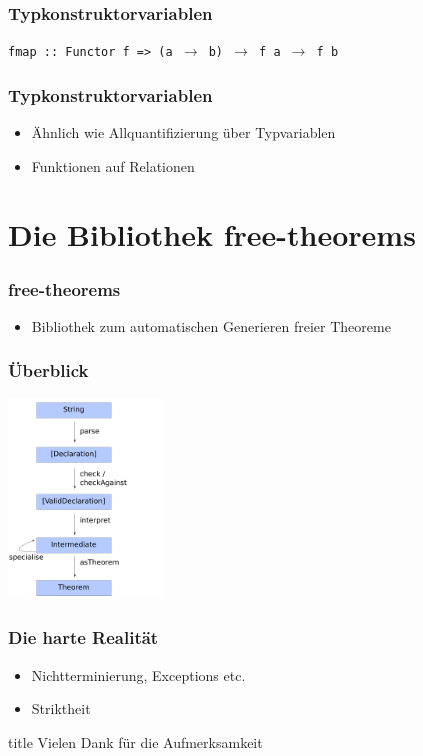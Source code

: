 \documentclass{beamer}
\begin{document}
\begin{frame}
\frametitle{Typkonstruktorvariablen}
\texttt{fmap :: Functor f => (a $\rightarrow$ b) $\rightarrow$ f\ a $\rightarrow$ f\ b}
\end{frame}

\begin{frame}
\frametitle{Typkonstruktorvariablen}
\begin{itemize}
\item Ähnlich wie Allquantifizierung über Typvariablen
\item Funktionen auf Relationen
\end{itemize}
\end{frame}

\section{Die Bibliothek free-theorems}

\begin{frame}
\frametitle{free-theorems}
\begin{itemize}
\item Bibliothek zum automatischen Generieren freier Theoreme
\end{itemize}
\end{frame}

\begin{frame}
\frametitle{Überblick}
\includegraphics[height=200px]{overview-free-theorems}
\end{frame}

\begin{frame}
\frametitle{Die harte Realität}

\begin{itemize}
\item Nichtterminierung, Exceptions etc.
\item Striktheit
\end{itemize}

\end{frame}

  \begin{frame}
  \vfill
  \centering
  \begin{beamercolorbox}[sep=8pt,center,shadow=true,rounded=true]{title}
    Vielen Dank für die Aufmerksamkeit\par%
  \end{beamercolorbox}
  \vfill
  \end{frame}
\end{document}
